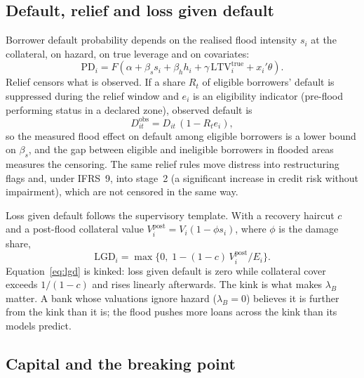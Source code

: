\subsection{Default, relief and loss given default}

Borrower default probability depends on the realised flood intensity $s_i$ at the collateral, on hazard, on true leverage and on covariates:
\begin{equation}
\mathrm{PD}_i = F(\alpha + \beta_s s_i + \beta_h h_i + \gamma\,\mathrm{LTV}^{\mathrm{true}}_i + x_i'\theta).
\end{equation}
Relief censors what is observed. If a share $R_t$ of eligible borrowers' default is suppressed during the relief window and $e_i$ is an eligibility indicator (pre-flood performing status in a declared zone), observed default is
\begin{equation}
D^{\mathrm{obs}}_{it} = D_{it}\,(1 - R_t e_i),
\end{equation}
so the measured flood effect on default among eligible borrowers is a lower bound on $\beta_s$, and the gap between eligible and ineligible borrowers in flooded areas measures the censoring. The same relief rules move distress into restructuring flags and, under IFRS~9, into stage~2 (a significant increase in credit risk without impairment), which are not censored in the same way.

Loss given default follows the supervisory template. With a recovery haircut $c$ and a post-flood collateral value $V^{\mathrm{post}}_i = V_i (1 - \phi s_i)$, where $\phi$ is the damage share,
\begin{equation}
\mathrm{LGD}_i = \max\{0,\; 1 - (1 - c)\,V^{\mathrm{post}}_i / E_i\}.
\label{eq:lgd}
\end{equation}
Equation~\eqref{eq:lgd} is kinked: loss given default is zero while collateral cover exceeds $1/(1-c)$ and rises linearly afterwards. The kink is what makes $\lambda_B$ matter. A bank whose valuations ignore hazard ($\lambda_B = 0$) believes it is further from the kink than it is; the flood pushes more loans across the kink than its models predict.

\subsection{Capital and the breaking point}

